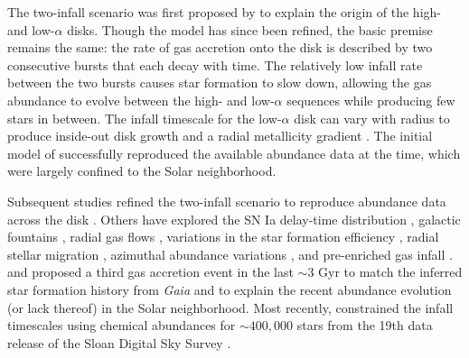 \documentclass[twocolumn,twocolappendix,linenumbers]{aastex631}
\begin{document}
The two-infall scenario was first proposed by \citet{chiappini_chemical_1997} to explain the origin of the high- and low-$\alpha$ disks. Though the model has since been refined, the basic premise remains the same: the rate of gas accretion onto the disk is described by two consecutive bursts that each decay with time. The relatively low infall rate between the two bursts causes star formation to slow down, allowing the gas abundance to evolve between the high- and low-$\alpha$ sequences while producing few stars in between. 
The infall timescale for the low-$\alpha$ disk can vary with radius to produce inside-out disk growth and a radial metallicity gradient \citep{romano_mass_2000}.
The initial model of \citet{chiappini_chemical_1997} successfully reproduced the available abundance data at the time, which were largely confined to the Solar neighborhood.

Subsequent studies refined the two-infall scenario to reproduce abundance data across the disk \citep[e.g.,][]{chiappini_abundance_2001,chiappini_oxygen_2003}. Others have explored the SN Ia delay-time distribution \citep{matteucci_effect_2009,palicio_analytic_2023}, galactic fountains \citep{spitoni_effects_2009}, radial gas flows \citep{spitoni_effects_2011,palla_chemical_2020}, variations in the star formation efficiency \citep{spitoni_effects_2011,palla_chemical_2020}, radial stellar migration \citep{spitoni_effect_2015,palla_mgfe_2022}, azimuthal abundance variations \citep{spitoni_2d_2019}, and pre-enriched gas infall \citep{palla_chemical_2020,spitoni_remind_2024}. \citet{spitoni_beyond_2023} and \citet{palla_mapping_2024} proposed a third gas accretion event in the last $\sim3$ Gyr to match the inferred star formation history from {\it Gaia} \citep{ruiz-lara_recurrent_2020} and to explain the recent abundance evolution (or lack thereof) in the Solar neighborhood. Most recently, \citet{hegedus_reconstructing_2025} constrained the infall timescales using chemical abundances for $\sim400,000$ stars from the 19th data release of the Sloan Digital Sky Survey \citep[SDSS;][]{sdss_collaboration_nineteenth_2025}.
\end{document}
